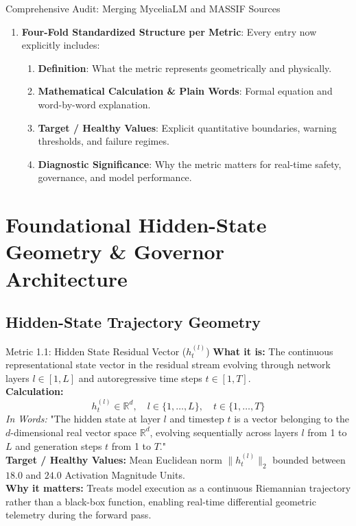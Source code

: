 \documentclass[10pt,a4paper]{article}
\begin{document}
\begin{logbox}{Comprehensive Audit: Merging MyceliaLM and MASSIF Sources}
\begin{enumerate}[leftmargin=*]
\begin{itemize}
    \end{itemize}
    \item \textbf{Four-Fold Standardized Structure per Metric}: Every entry now explicitly includes:
    \begin{enumerate}
        \item \textbf{Definition}: What the metric represents geometrically and physically.
        \item \textbf{Mathematical Calculation \& Plain Words}: Formal equation and word-by-word explanation.
        \item \textbf{Target / Healthy Values}: Explicit quantitative boundaries, warning thresholds, and failure regimes.
        \item \textbf{Diagnostic Significance}: Why the metric matters for real-time safety, governance, and model performance.
    \end{enumerate}
\end{enumerate}
\end{logbox}

\newpage

\section{Foundational Hidden-State Geometry \& Governor Architecture}

\subsection{Hidden-State Trajectory Geometry}
\begin{metricbox}{Metric 1.1: Hidden State Residual Vector ($h^{(l)}_t$)}
\textbf{What it is:} The continuous representational state vector in the residual stream evolving through network layers $l \in [1, L]$ and autoregressive time steps $t \in [1, T]$.\\
\textbf{Calculation:}
$$h^{(l)}_t \in \mathbb{R}^d, \quad l \in \{1, \dots, L\}, \quad t \in \{1, \dots, T\}$$
\emph{In Words:} "The hidden state at layer $l$ and timestep $t$ is a vector belonging to the $d$-dimensional real vector space $\mathbb{R}^d$, evolving sequentially across layers $l$ from 1 to $L$ and generation steps $t$ from 1 to $T$."\\
\textbf{Target / Healthy Values:} Mean Euclidean norm $\|h^{(l)}_t\|_2$ bounded between $18.0$ and $24.0$ Activation Magnitude Units.\\
\textbf{Why it matters:} Treats model execution as a continuous Riemannian trajectory rather than a black-box function, enabling real-time differential geometric telemetry during the forward pass.
\end{metricbox}
\end{document}
